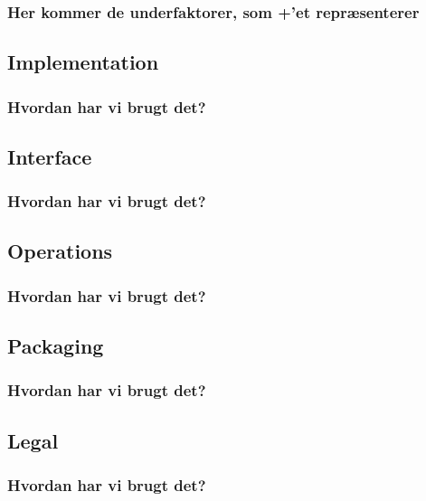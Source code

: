 \subsubsection*{Her kommer de underfaktorer, som +'et repræsenterer}
\subsection{Implementation}
\subsubsection{Hvordan har vi brugt det?}
\subsection{Interface}
\subsubsection{Hvordan har vi brugt det?}
\subsection{Operations}
\subsubsection{Hvordan har vi brugt det?}
\subsection{Packaging}
\subsubsection{Hvordan har vi brugt det?}
\subsection{Legal}
\subsubsection{Hvordan har vi brugt det?}